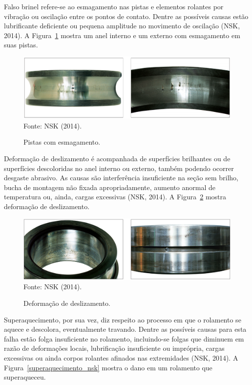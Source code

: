 \documentclass[
	12pt,				
	oneside,			
	a4paper,			
	english,			
	brazil,			
	]{abntex2ppgsi}
\begin{document}
Falso brinel refere-se ao esmagamento nas pistas e elementos rolantes por vibração ou oscilação entre os pontos de contato. Dentre as possíveis causas estão lubrificante deficiente ou pequena amplitude no movimento de oscilação (NSK, 2014). A Figura~\ref{esmagamento_nsk} mostra um anel interno e um externo com esmagamento em suas pistas.

\begin{figure}[H]
\centering
\caption {Pistas com esmagamento.}
\includegraphics[width=\textwidth,height=\textheight,keepaspectratio]{esmagamento_nsk} \\
Fonte: NSK (2014).
\label{esmagamento_nsk}
\end{figure}

Deformação de deslizamento é acompanhada de superfícies brilhantes ou de superfícies descoloridas no anel interno ou externo, também podendo ocorrer desgaste abrasivo. As causas são interferência insuficiente na seção sem brilho, bucha de montagem não fixada apropriadamente, aumento anormal de temperatura ou, ainda, cargas excessivas (NSK, 2014). A Figura~\ref{deslizamento_nsk} mostra deformação de deslizamento.

\begin{figure}[H]
\centering
\caption {Deformação de deslizamento.}
\includegraphics[width=\textwidth,height=\textheight,keepaspectratio]{deslizamento_nsk} \\
Fonte: NSK (2014).
\label{deslizamento_nsk}
\end{figure}

Superaquecimento, por sua vez, diz respeito ao processo em que o rolamento se aquece e descolora, eventualmente travando. Dentre as possíveis causas para esta falha estão folga insuficiente no rolamento, incluindo-se folgas que diminuem em razão de deformações locais, lubrificação insuficiente ou imprópria, cargas excessivas ou ainda corpos rolantes afinados nas extremidades (NSK, 2014). A Figura~\ref{superaquecimento_nsk} mostra o dano em um rolamento que superaqueceu.
\end{document}
